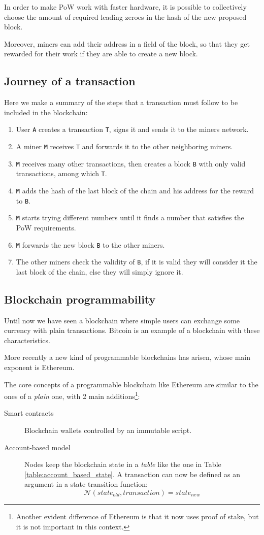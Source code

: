 \documentclass[12pt]{article}
\begin{document}
In order to make PoW work with faster hardware, it is possible to collectively choose the amount of required leading zeroes in the hash of the new proposed block.

Moreover, miners can add their address in a field of the block, so that they get rewarded for their work if they are able to create a new block.

\subsection{Journey of a transaction} \label{subsection:joat}
Here we make a summary of the steps that a transaction must follow to be included in the blockchain:
\begin{enumerate}
    \item User \verb|A| creates a transaction \verb|T|, signs it and sends it to the miners network.
    \item A miner \verb|M| receives \verb|T| and forwards it to the other neighboring miners.
    \item \verb|M| receives many other transactions, then creates a block \verb|B| with only valid transactions, among which \verb|T|.
    \item \verb|M| adds the hash of the last block of the chain and his address for the reward to \verb|B|.
    \item \verb|M| starts trying different numbers until it finds a number that satisfies the PoW requirements.
    \item \verb|M| forwards the new block \verb|B| to the other miners. 
    \item The other miners check the validity of \verb|B|, if it is valid they will consider it the last block of the chain, else they will simply ignore it.
\end{enumerate}

\subsection{Blockchain programmability} \label{subsection:programmability}
Until now we have seen a blockchain where simple users can exchange some currency with plain transactions. Bitcoin is an example of a blockchain with these characteristics.

More recently a new kind of programmable blockchains has arisen, whose main exponent is Ethereum. 

The core concepts of a programmable blockchain like Ethereum are similar to the ones of a \textit{plain} one, with 2 main additions\footnote{Another evident difference of Ethereum is that it now uses proof of stake, but it is not important in this context.}:
\begin{description}
    \item[Smart contracts] Blockchain wallets controlled by an immutable script.
    \item[Account-based model] Nodes keep the blockchain state in a \textit{table} like the one in Table \ref{table:account_based_state}. A transaction can now be defined as an argument in a state transition function: 
    \[\mathcal{N} (state_{old}, transaction) = state_{new}\]
\end{description}
\end{document}
